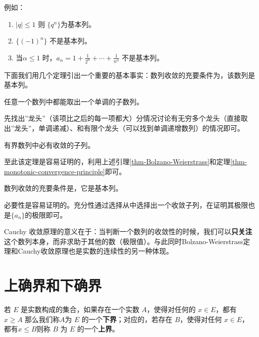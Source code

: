 \noindent 例如：

\begin{enumerate}
	\item $|q|\le 1$ 则 $\{q^n\}$为基本列。
	\item $\{(-1)^n\}$ 不是基本列。
	\item 当$\alpha \le 1$ 时，$a_n = 1 + \frac{1}{2 ^ \alpha} +\cdots + \frac{1}{n^\alpha}$ 不是基本列。
\end{enumerate}

下面我们用几个定理引出一个重要的基本事实：数列收敛的充要条件为，该数列是基本列。

\begin{lemma}
	任意一个数列中都能取出一个单调的子数列。
\end{lemma}

\maketip 先找出''龙头''（该项比之后的每一项都大）分情况讨论有无穷多个龙头（直接取出''龙头''，单调递减）、和有限个龙头（可以找到单调递增数列）的情况即可。

\begin{theorem}
	有界数列中必有收敛的子列。\label{thm-Bolzano-Weierstrass}
\end{theorem}

\maketip 至此该定理是容易证明的，利用上述引理\ref{thm-Bolzano-Weierstrass}和定理\ref{thm-monotonic-convergence-principle}即可。

\begin{theorem}\label{thm-cauchy-convergence}
	数列收敛的充要条件是，它是基本列。
\end{theorem}

\maketip 必要性是容易证明的。充分性通过选择从中选择出一个收敛子列，在证明其极限也是$\{a_n\}$的极限即可。

\maketip Cauchy 收敛原理的意义在于：当判断一个数列的收敛性的时候，我们可以\textbf{只关注}这个数列本身，而非求助于其他的数（极限值）。与此同时Bolzano-Weierstrass定理和Cauchy收敛原理也是实数的连续性的另一种体现。

\section{上确界和下确界}

\begin{definition}[上界、下界]
	若 $E$ 是实数构成的集合，如果存在一个实数 $A$，使得对任何的 $x\in E$，都有 $x\ge A$ 那么我们称$A$为 $E$ 的一个\textbf{下界}；对应的，若存在 $B$，使得对任何 $x\in E$，都有$x\le B$则称 $B$ 为 $E$ 的一个\textbf{上界}。
\end{definition}


